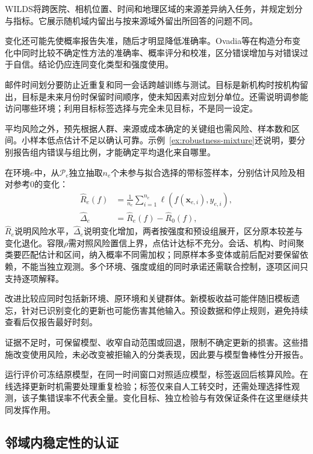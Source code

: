 WILDS将跨医院、相机位置、时间和地理区域的来源差异纳入任务，并规定划分与指标。它展示随机域内留出与按来源域外留出所回答的问题不同。

\Needspace{45mm}
变化还可能先使概率报告失准，随后才明显降低准确率。Ovadia等在构造分布变化中同时比较不确定性方法的准确率、概率评分和校准，区分错误增加与对错误过于自信。结论仍应连同变化类型和强度使用。

邮件时间划分要防止近重复和同一会话跨越训练与测试。目标是新机构时按机构留出，目标是未来月份时保留时间顺序，使未知因素对应划分单位。还需说明调参能访问哪些环境；利用目标标签选择与完全未见目标，不是同一设定。

平均风险之外，预先根据人群、来源或成本确定的关键组也需风险、样本数和区间。小样本低点估计不足以确认可靠。示例~\ref{ex:robustness-mixture}还说明，要分别报告组内错误与组比例，才能确定平均退化来自哪里。

在环境$e$中，从$\mathcal P_e$独立抽取$n_e$个未参与拟合选择的带标签样本，分别估计风险及相对参考$0$的变化：
\begin{equation}
 \begin{aligned}
 \widehat R_e(f)&=\frac{1}{n_e}\sum_{i=1}^{n_e}
       \ell(f(\bm{x}_{e,i}),y_{e,i}),\\
 \widehat\Delta_e&=\widehat R_e(f)-\widehat R_0(f),
 \end{aligned}
 \label{eq:robustness-environment-test}
\end{equation}
$\widehat R_e$说明风险水平，$\widehat\Delta_e$说明变化增加，两者按强度和预设组展开，区分原本较差与变化退化。容限$\rho$需对照风险置信上界，点估计达标不充分。会话、机构、时间聚类要匹配估计和区间，纳入概率不同需加权；同原样本多变体或前后配对要保留依赖，不能当独立观测。多个环境、强度或组的同时承诺还需联合控制，逐项区间只支持逐项解释。

改进比较应同时包括新环境、原环境和关键群体。新模板收益可能伴随旧模板遗忘，针对已识别变化的更新也可能伤害其他输入。预设数据和停止规则，避免持续查看后仅报告最好时刻。

证据不足时，可保留模型、收窄自动范围或回退，限制不确定更新的损害。这些措施改变使用风险，未必改变被拒输入的分类表现，因此要与模型鲁棒性分开报告。

运行评价可冻结原模型，在同一时间窗口对照适应模型，标签返回后核算风险。在线选择更新时机需要处理重复检验；标签仅来自人工转交时，还需处理选择性观测，该子集错误率不代表全量。变化目标、独立检验与有效保证条件在这里继续共同发挥作用。

\subsection{邻域内稳定性的认证}
\label{sec:robustness-certification}

